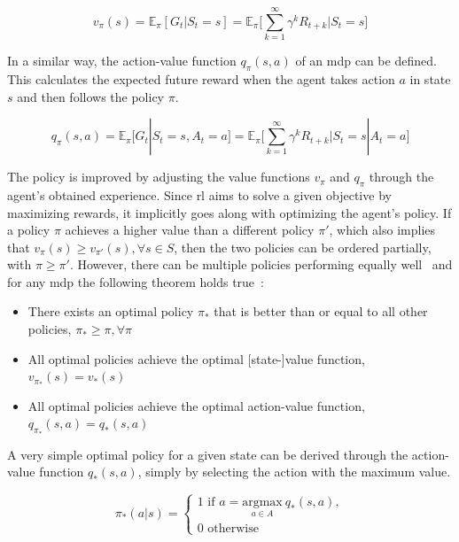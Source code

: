 \documentclass[draft,final]{vutinfth} %
\newcommand{\p}[1]{see p. #1}
\begin{document}
    \begin{equation}
        v_\pi(s) = \mathbb{E}_\pi[G_t|S_t = s] = \mathbb{E}_\pi \Bigg[\sum_{k=1}^{\infty} \gamma^k R_{t+k} \bigg| S_t = s \Bigg]\label{eq:value_function}
    \end{equation}

    In a similar way, the action-value function $q_\pi(s,a)$ of an \gls{mdp} can be defined.
    This calculates the expected future reward when the agent takes action $a$ in state $s$ and then follows the policy $\pi$.

    \begin{equation}
        q_\pi(s,a) = \mathbb{E}_\pi[G_t|S_t = s, A_t = a] = \mathbb{E}_\pi \Bigg[\sum_{k=1}^{\infty} \gamma^k R_{t+k} \bigg| S_t = s | A_t = a \Bigg]\label{eq:quality_function}
    \end{equation}

    The policy is improved by adjusting the value functions $v_\pi$ and $q_\pi$ through the agent's obtained experience.
    Since \gls{rl} aims to solve a given objective by maximizing rewards, it implicitly goes along with optimizing the agent's policy.
    If a policy $\pi$ achieves a higher value than a different policy $\pi'$, which also implies that $v_\pi(s) \geq v_{\pi'}(s), \forall s \in \mathit{S}$, then the two policies can be ordered partially, with $\pi \geq \pi'$.
    However, there can be multiple policies performing equally well~\citep[\p{62f}]{sutton_reinforcement_2018} and for any \gls{mdp} the following theorem holds true~\citepOnline[\p{43}]{silver_lecture_2015-1}:

    \begin{itemize}
        \item There exists an optimal policy $\pi_*$ that is better than or equal to all other policies, $\pi_* \geq \pi, \forall\pi$
        \item All optimal policies achieve the optimal [state-]value function, $v_{\pi_*}(s) = v_*(s)$
        \item All optimal policies achieve the optimal action-value function, $q_{\pi_*}(s,a) = q_*(s,a)$
    \end{itemize}

    A very simple optimal policy for a given state can be derived through the action-value function $q_*(s,a)$, simply by selecting the action with the maximum value.

    \begin{equation}
        \pi_*(a|s) =
        \begin{cases}
            1 \text{ if } a =  \underset{a \in \mathit{A}}{\text{argmax}}\ q_*(s,a),\\
            0 \text{ otherwise }
        \end{cases}
    \end{equation}
\end{document}
